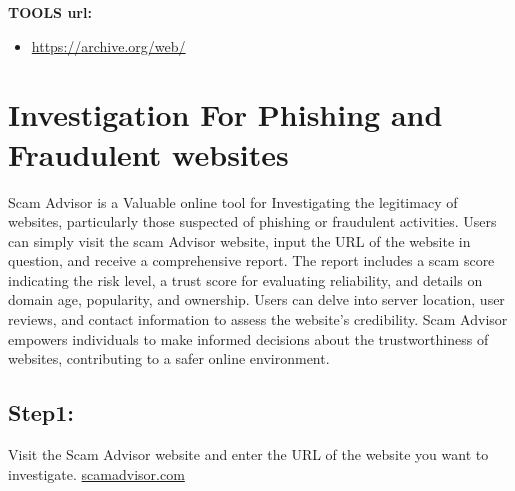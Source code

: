 \documentclass[11pt]{article}
\begin{document}
\textbf{TOOLS url:}
\begin{itemize}
    \item \url{https://archive.org/web/}
\end{itemize}

\section{\textbf{Investigation For Phishing and Fraudulent websites}}
Scam Advisor is a Valuable online tool for Investigating the legitimacy of websites, particularly those suspected of phishing or fraudulent activities. Users can simply visit the scam Advisor website, input the URL of the website in question, and receive a comprehensive report. The report includes a scam score indicating the risk level, a trust score for evaluating reliability, and details on domain age, popularity, and ownership. Users can delve into server location, user reviews, and contact information to assess the website's credibility. Scam Advisor empowers individuals to make informed decisions about the trustworthiness of websites, contributing to a safer online environment.

\subsection {Step1:} 
Visit the Scam Advisor website and enter the URL of the website you want to investigate.
\url{scamadvisor.com}

\clearpage

\pagebreak
\end{document}
